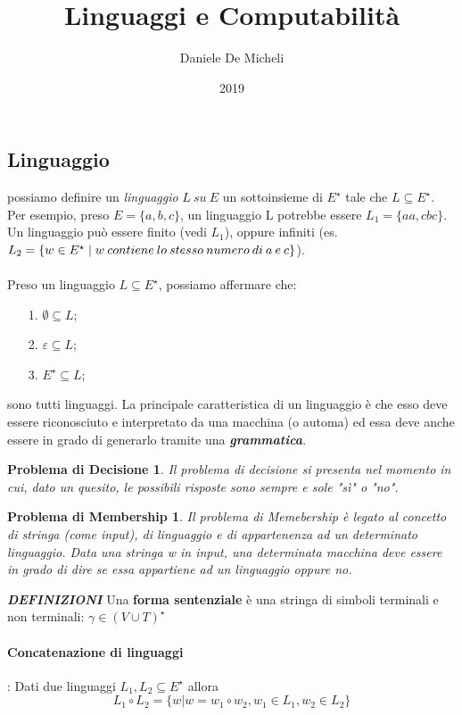 \documentclass[11pt]{article}
\title{Linguaggi e Computabilità}
\author{Daniele De Micheli}
\date{2019}
\newtheorem*{problemaDecisione}{Problema di Decisione}
\newtheorem*{problemaMembership}{Problema di Membership}
\begin{document}

\subsection{Linguaggio} possiamo definire un \textit{linguaggio} $L \medspace su \medspace E$ un sottoinsieme di $E^{\star}$ tale che $L \subseteq E^{\star}$. Per esempio, preso $E = \{a,b,c\}$, un linguaggio L potrebbe essere $L_{1}=\{aa,cbc\}$. Un linguaggio può essere finito (vedi $L_ {1}$), oppure infiniti (es. $L_{2} = \{ w \in E^{\star} \thickspace | \thickspace w \medspace contiene \medspace lo \medspace stesso \medspace numero \medspace di \medspace a \medspace e \medspace c\}$).
\\ \\
Preso un linguaggio $L \subseteq E^{\star}$, possiamo affermare che:
\begin{itemize}
\item[1.] $ \emptyset \subseteq L$;
\item[2.] $ \varepsilon \subseteq L $;
\item[3.] $ E^{\star} \subseteq L$;
\end{itemize}
sono tutti linguaggi. La principale caratteristica di un linguaggio è che esso deve essere riconosciuto e interpretato da una macchina (o automa) ed essa deve anche essere in grado di generarlo tramite una \textbf{\textit{grammatica}}.
\begin{problemaDecisione}
Il problema di decisione si presenta nel momento in cui, dato un quesito, le possibili risposte sono sempre e sole "sì" o "no".
\end{problemaDecisione}
\begin{problemaMembership}
Il problema di Memebership è legato al concetto di stringa (come input), di linguaggio e di appartenenza ad un determinato linguaggio. Data una stringa w in input, una determinata macchina deve essere in grado di dire se essa appartiene ad un linguaggio oppure no.
\end{problemaMembership}

\textbf{\textit{DEFINIZIONI}}
Una \textbf{forma sentenziale} è una stringa di simboli terminali e non terminali: $\gamma \in (V \cup T)^{\star}$

\paragraph{Concatenazione di linguaggi}: Dati due linguaggi $L_1, L_2 \subseteq E^{\star}$ allora $$L_1 \circ L_2 = \{ w | w = w_1 \circ w_2, w_1 \in L_1, w_2 \in L_2\} $$
\end{document}
